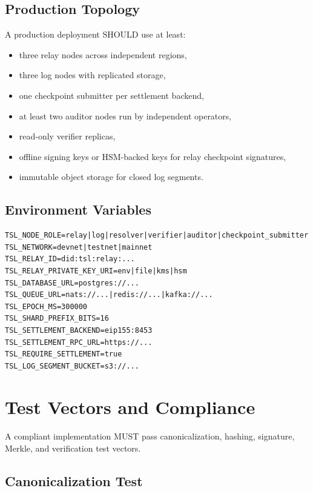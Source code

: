 \documentclass[11pt]{article}
\begin{document}
\subsection{Production Topology}

A production deployment SHOULD use at least:

\begin{itemize}
    \item three relay nodes across independent regions,
    \item three log nodes with replicated storage,
    \item one checkpoint submitter per settlement backend,
    \item at least two auditor nodes run by independent operators,
    \item read-only verifier replicas,
    \item offline signing keys or HSM-backed keys for relay checkpoint signatures,
    \item immutable object storage for closed log segments.
\end{itemize}

\subsection{Environment Variables}

\begin{lstlisting}[style=tslcode]
TSL_NODE_ROLE=relay|log|resolver|verifier|auditor|checkpoint_submitter
TSL_NETWORK=devnet|testnet|mainnet
TSL_RELAY_ID=did:tsl:relay:...
TSL_RELAY_PRIVATE_KEY_URI=env|file|kms|hsm
TSL_DATABASE_URL=postgres://...
TSL_QUEUE_URL=nats://...|redis://...|kafka://...
TSL_EPOCH_MS=300000
TSL_SHARD_PREFIX_BITS=16
TSL_SETTLEMENT_BACKEND=eip155:8453
TSL_SETTLEMENT_RPC_URL=https://...
TSL_REQUIRE_SETTLEMENT=true
TSL_LOG_SEGMENT_BUCKET=s3://...
\end{lstlisting}

\section{Test Vectors and Compliance}

A compliant implementation MUST pass canonicalization, hashing, signature, Merkle, and verification test vectors.

\subsection{Canonicalization Test}
\end{document}
